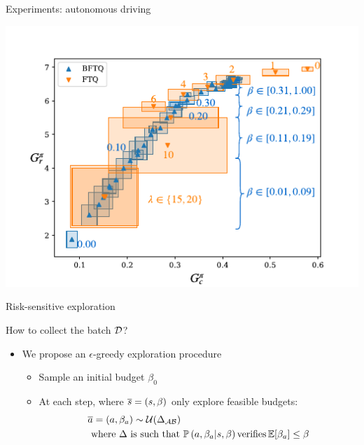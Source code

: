 \documentclass{beamer}
\begin{document}
    \begin{frame}{Experiments: autonomous driving}
        \begin{center}
            \includegraphics[width=\textwidth]{img/highway.pdf}
        \end{center}
    \end{frame}

    \begin{frame}{Risk-sensitive exploration}

        How to collect the batch $\mathcal{D}$?

        \begin{itemize}
            \item We propose an $\epsilon$-greedy exploration procedure
            \begin{itemize}
                \pause\item Sample an initial budget $\beta_0$
                \pause\item At each step, where $\overline{s}=(s,\beta)$ only explore feasible budgets:
                \pause\begin{align*}
                          &\overline{a} = (a, \beta_a)\sim\mathcal{U}(\Delta_{\mathcal{A}\mathcal{B}})\\
                          &\text{ where }  \Delta \text{ is such that }\mathbb{P}\left(a, \beta_a|s, \beta\right) \text{verifies} \operatorname*{\mathbb{E}}[\beta_a]\leq\beta
                \end{align*}
            \end{itemize}
        \end{itemize}


    \end{frame}
\end{document}
